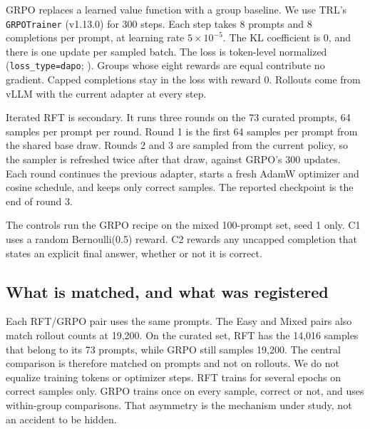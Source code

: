 GRPO \citep{shao2024deepseekmath} replaces a learned value function with a group baseline. We use TRL's \texttt{GRPOTrainer} (v1.13.0) for 300 steps. Each step takes 8 prompts and 8 completions per prompt, at learning rate $5{\times}10^{-5}$. The KL coefficient is 0, and there is one update per sampled batch. The loss is token-level normalized (\texttt{loss\_type=dapo}; \citealp{yu2025dapo}). Groups whose eight rewards are equal contribute no gradient. Capped completions stay in the loss with reward 0. Rollouts come from vLLM \citep{kwon2023vllm} with the current adapter at every step.

Iterated RFT is secondary. It runs three rounds on the 73 curated prompts, 64 samples per prompt per round. Round 1 is the first 64 samples per prompt from the shared base draw. Rounds 2 and 3 are sampled from the current policy, so the sampler is refreshed twice after that draw, against GRPO's 300 updates. Each round continues the previous adapter, starts a fresh AdamW optimizer and cosine schedule, and keeps only correct samples. The reported checkpoint is the end of round 3.

The controls run the GRPO recipe on the mixed 100-prompt set, seed 1 only. C1 uses a random Bernoulli(0.5) reward. C2 rewards any uncapped completion that states an explicit final answer, whether or not it is correct.

\subsection{What is matched, and what was registered}
\label{sec:budgets}

Each RFT/GRPO pair uses the same prompts. The Easy and Mixed pairs also match rollout counts at 19{,}200. On the curated set, RFT has the 14{,}016 samples that belong to its 73 prompts, while GRPO still samples 19{,}200. The central comparison is therefore matched on prompts and not on rollouts. We do not equalize training tokens or optimizer steps. RFT trains for several epochs on correct samples only. GRPO trains once on every sample, correct or not, and uses within-group comparisons. That asymmetry is the mechanism under study, not an accident to be hidden.

